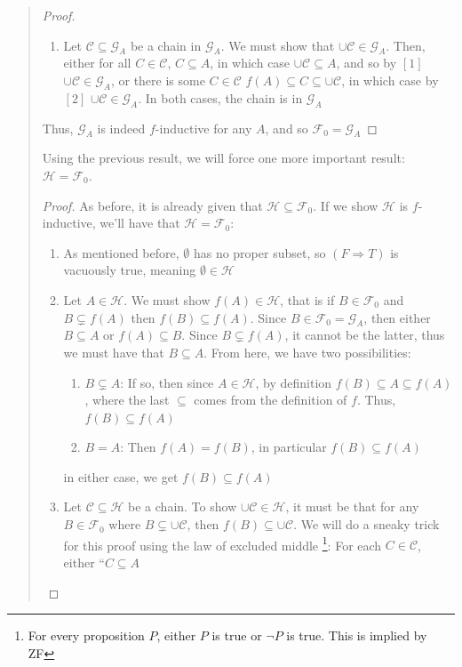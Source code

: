 \documentclass[oneside]{book}
\newcommand{\CC}{\mathcal{C}}
\newcommand{\CG}{\mathcal{G}}
\newcommand{\CH}{\mathcal{H}}
\newcommand{\ff}{\mathscr{F}}
\newcommand{\sse}{\subseteq}
\newcommand{\ssne}{\subsetneq}
\newcommand{\Rw}{\Rightarrow}
\begin{document}
\begin{Proof}
\begin{quote}
\begin{enumerate}
\begin{proof}
\begin{enumerate}
\begin{enumerate}
									and so by condition $[2]$, $f(C) \in \CG_A$
							\end{enumerate}
							in all cases, $f(C) \in \CG_A$
						\item Let $\CC\sse \CG_A$ be a chain in $\CG_A$. We must show that $\cup \CC \in \CG_A$.	Then,
							either for all $C \in \CC$, $C \sse A$, in which case $\cup \CC \sse A$, and so by $[1]$
							$\cup \CC \in \CG_A$, or there is some $C \in \CC$ $f(A) \sse C \sse \cup \CC$, in which case
							by $[2]$ $\cup \CC \in\CG_A$. In both cases, the chain is in $\CG_A$
					\end{enumerate}
					Thus, $\CG_A$ is indeed $f$-inductive for any $A$, and so $\ff_0 = \CG_A$


				\end{proof}

				Using the previous result, we will force one more important result: $\CH = \ff_0$.
				\begin{proof}
					As before, it is already given that $\CH
					\sse \ff_0$. If we show $\CH$ is $f$-inductive, we'll have that $\CH = \ff_0$:
					\begin{enumerate}
						\item As mentioned before, $\emptyset$ has no proper subset, so $(F \Rw T)$ is vacuously true,
							meaning $\emptyset \in \CH$
						\item Let $A \in \CH$. We must show $f(A) \in \CH$, that is if $B \in \ff_0$ and $B \ssne f(A)$
							then $f(B) \sse f(A)$. Since $B \in \ff_0 = \CG_A$, then either $B \sse A$ or $f(A) \sse B$.
							Since $B \ssne f(A)$, it cannot be the latter, thus we must have that $B \sse A$. From here,
							we have two possibilities:
							\begin{enumerate}
								\item $B\ssne A$: If so, then since $A \in \CH$, by definition $f(B) \sse A \sse f(A)$,
									where the last $\sse$ comes from the definition of $f$. Thus, $f(B) \sse f(A)$
								\item $B = A$: Then $f(A) = f(B)$, in particular $f(B) \sse f(A)$
							\end{enumerate}
							in either case, we get $f(B) \sse f(A)$
						\item Let $\CC \sse \CH$ be a chain. To show $\cup\CC \in \CH$, it must be that for any $B\in
							\ff_0$ where $B \ssne \cup \CC$, then $f(B) \sse \cup\CC$.  We will do a sneaky trick for
							this proof using the law of excluded middle \footnote{For every proposition $P$, either $P$ is
							true or $\neg P$ is true. This is implied by ZF}: For each $C \in \CC$, either ``$C \sse A$

\end{enumerate}
\end{proof}
\end{enumerate}
\end{quote}
\end{Proof}
\end{document}
